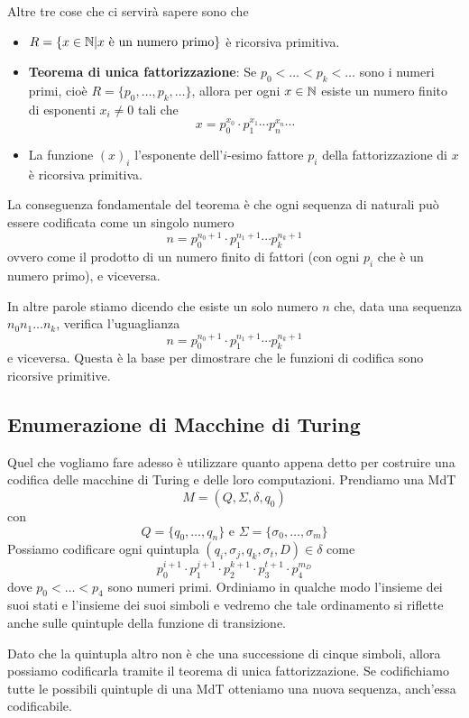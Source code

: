 Altre tre cose che ci servirà sapere sono che
\begin{itemize}
	\item $R = \{ x \in \mathbb{N} | x \text{ è un numero primo} \}$
	      è ricorsiva primitiva.
	\item \textbf{Teorema di unica fattorizzazione}: Se
	      $p_0 < \dots < p_k < \dots$ sono i numeri primi,
	      cioè $R = \{ p_0, \dots, p_k, \dots \}$, allora per
	      ogni $x \in \mathbb{N}$ esiste un numero finito di esponenti
	      $x_i \neq 0$ tali che
	      \[
		      x = p_0^{x_0} \cdot p_1^{x_1} \cdots
		      p_n^{x_n} \cdots
	      \]
	\item La funzione $(x)_i$ l'esponente dell'$i$-esimo
	      fattore $p_i$ della fattorizzazione di $x$ è
	      ricorsiva primitiva.
\end{itemize}
La conseguenza fondamentale del teorema è che ogni sequenza
di naturali può essere codificata come un singolo numero
\[
	n = p_0^{n_0 + 1} \cdot p_1^{n_1 + 1} \cdots
	p_k^{n_k + 1}
\]
ovvero come il prodotto di un numero finito di fattori (con
ogni $p_i$ che è un numero primo), e viceversa.

In altre parole stiamo dicendo che esiste un solo numero $n$
che, data una sequenza $n_0 n_1 \dots n_k$, verifica
l'uguaglianza
\[
	n = p_0^{n_0 + 1} \cdot p_1^{n_1 + 1} \cdots
	p_k^{n_k + 1}
\]
e viceversa. Questa è la base per dimostrare che le funzioni
di codifica sono ricorsive primitive.

\subsection{Enumerazione di Macchine di Turing}
\label{ssec: enum MdT}
Quel che vogliamo fare adesso è utilizzare quanto appena detto
per costruire una codifica delle macchine di Turing e delle
loro computazioni. Prendiamo una MdT
\[ M = (Q, \Sigma, \delta, q_0) \]
con
\[
	Q = \{ q_0, \dots, q_n \} \text { e }
	\Sigma = \{ \sigma_0, \dots, \sigma_m \}
\]
Possiamo codificare ogni quintupla
$(q_i, \sigma_j, q_k, \sigma_t, D) \in \delta$ come
\[
	p_0^{i+1} \cdot p_1^{j+1} \cdot
	p_2^{k+1} \cdot p_3^{t+1} \cdot p_4^{m_D}
\]
dove $p_0 < \dots < p_4$ sono numeri primi. Ordiniamo in qualche
modo l'insieme dei suoi stati e l'insieme dei suoi simboli e
vedremo che tale ordinamento si riflette anche sulle quintuple
della funzione di transizione.

Dato che la quintupla altro non è che una successione di cinque
simboli, allora possiamo codificarla tramite il teorema di unica
fattorizzazione. Se codifichiamo tutte le possibili quintuple di
una MdT otteniamo una nuova sequenza, anch'essa codificabile.

